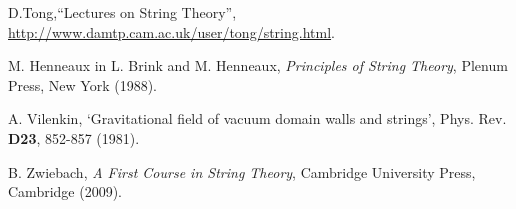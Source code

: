 \documentclass{article}
\begin{document}
\begin{thebibliography}{99}

 D.Tong,``Lectures on String Theory'', \url{http://www.damtp.cam.ac.uk/user/tong/string.html}.

  M. Henneaux in L. Brink and M. Henneaux, {\it Principles of String Theory}, Plenum Press, New York (1988).

 A. Vilenkin, `Gravitational field of vacuum domain walls and strings', Phys. Rev. {\bf D23}, 852-857 (1981).

 B. Zwiebach, {\it A First Course in String Theory}, Cambridge University Press, Cambridge (2009).

\end{thebibliography}
\end{document}
